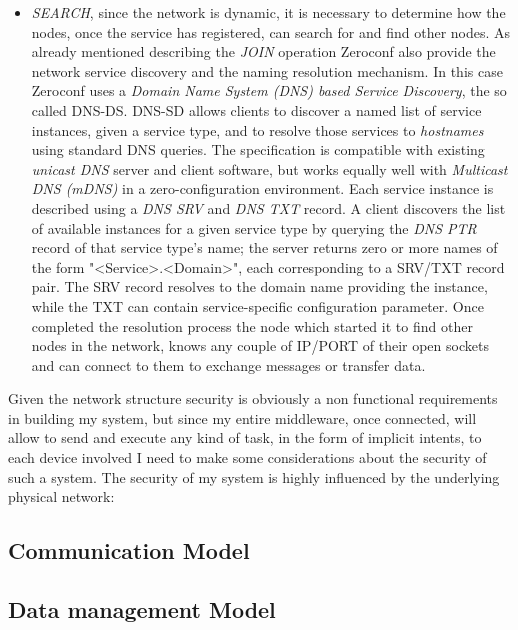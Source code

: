 \begin{itemize}
	\item \textit{SEARCH}, since the network is dynamic, it is necessary to determine how the nodes, once the service has registered, can search for and find other nodes. As already mentioned describing the \textit{JOIN} operation Zeroconf also provide the network service discovery and the naming resolution mechanism. In this case Zeroconf uses a \textit{Domain Name System (DNS) based Service Discovery}, the so called DNS-DS. DNS-SD allows clients to discover a named list of service instances, given a service type, and to resolve those services to \textit{hostnames} using standard DNS queries. The specification is compatible with existing \textit{unicast DNS} server and client software, but works equally well with \textit{Multicast DNS (mDNS)} in a zero-configuration environment. Each service instance is described using a \textit{DNS SRV} and \textit{DNS TXT} record. A client discovers the list of available instances for a given service type by querying the \textit{DNS PTR} record of that service type's name; the server returns zero or more names of the form "<Service>.<Domain>", each corresponding to a SRV/TXT record pair. The SRV record resolves to the domain name providing the instance, while the TXT can contain service-specific configuration parameter. Once completed the resolution process the node which started it to find other nodes in the network, knows any couple of IP/PORT of their open sockets and can connect to them to exchange messages or transfer data.
\end{itemize}
Given the network structure security is obviously a non functional requirements in building my system, but since my entire middleware, once connected, will allow to send and execute any kind of task, in the form of implicit intents, to each device involved I need to make some considerations about the security of such a system. The security of my system is highly influenced by the underlying physical network: 
 
 \subsection{Communication Model}
 
 \subsection{Data management Model}

 



%
